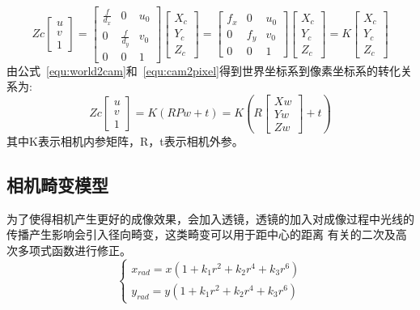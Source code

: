 \begin{equation}
Z c\left[\begin{array}{l}{u} \\ {v} \\ {1}\end{array}\right]=\left[\begin{array}{ccc}{\frac{f}{d_{x}}} & {0} & {u_{0}} \\ {0} & {\frac{f}{d_{y}}} & {v_{0}} \\ {0} & {0} & {1}\end{array}\right]\left[\begin{array}{c}{X_{c}} \\ {Y_{c}} \\ {Z_{c}}\end{array}\right]=\left[\begin{array}{ccc}{f_{x}} & {0} & {u_{0}} \\ {0} & {f_{y}} & {v_{0}} \\ {0} & {0} & {1}\end{array}\right]\left[\begin{array}{c}{X_{c}} \\ {Y_{c}} \\ {Z_{c}}\end{array}\right]=K\left[\begin{array}{c}{X_{c}} \\ {Y_{c}} \\ {Z_{c}}\end{array}\right]
  \label{equ:cam2pixel}
\end{equation}
由公式~\ref{equ:world2cam}和~\ref{equ:cam2pixel}得到世界坐标系到像素坐标系的转化关系为:
\begin{equation}
Z c\left[\begin{array}{l}{u} \\ {v} \\ {1}\end{array}\right]=K(R P w+t)=K\left(R\left[\begin{array}{l}{X w} \\ {Y w} \\ {Z w}\end{array}\right]+t\right)
\end{equation}
其中K表示相机内参矩阵，R，t表示相机外参。


\subsection{相机畸变模型}
为了使得相机产生更好的成像效果，会加入透镜，透镜的加入对成像过程中光线的传播产生影响会引入径向畸变，这类畸变可以用于距中心的距离
有关的二次及高次多项式函数进行修正。
\begin{equation}
\left\{\begin{array}{l}{x_{r a d}=x\left(1+k_{1} r^{2}+k_{2} r^{4}+k_{3} r^{6}\right)} \\ {y_{r a d}=y\left(1+k_{1} r^{2}+k_{2} r^{4}+k_{3} r^{6}\right)}\end{array}\right.
\end{equation}

